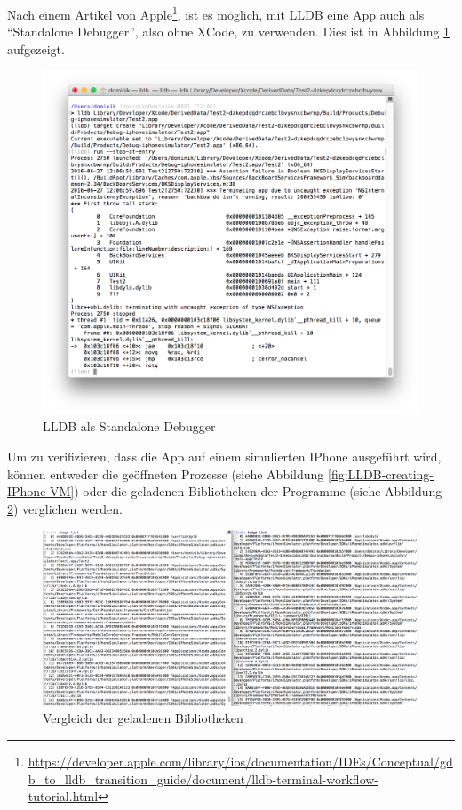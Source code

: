 Nach einem Artikel von Apple\footnote{\url{https://developer.apple.com/library/ios/documentation/IDEs/Conceptual/gdb_to_lldb_transition_guide/document/lldb-terminal-workflow-tutorial.html}}, ist es möglich, mit  LLDB eine App auch als "`Standalone Debugger"', also ohne XCode, zu verwenden. Dies ist in Abbildung \ref{fig:LLDBStandaloneDebugger} aufgezeigt.\\

\begin{figure}[htbp]
	\centering
	\includegraphics[width=\textwidth]{bilder/pentest_mobile_anwendungen/vergleich_aktuelle_situation/20160627_LLDB-Standalone-Debugger.png}
	\caption{LLDB als Standalone Debugger}
	\label{fig:LLDBStandaloneDebugger}
\end{figure}

Um zu verifizieren, dass die App auf einem simulierten IPhone ausgeführt wird, können entweder die geöffneten Prozesse (siehe Abbildung \ref{fig:LLDB-creating-IPhone-VM}) oder die geladenen Bibliotheken der Programme (siehe Abbildung \ref{fig:VergleichLLDBImages}) verglichen werden.\\

\begin{figure}[htbp]
	\centering
	\includegraphics[width=\textwidth]{bilder/pentest_mobile_anwendungen/vergleich_aktuelle_situation/20160627_LLDB-image-list.png}
	\caption{Vergleich der geladenen Bibliotheken}
	\label{fig:VergleichLLDBImages}
\end{figure}

